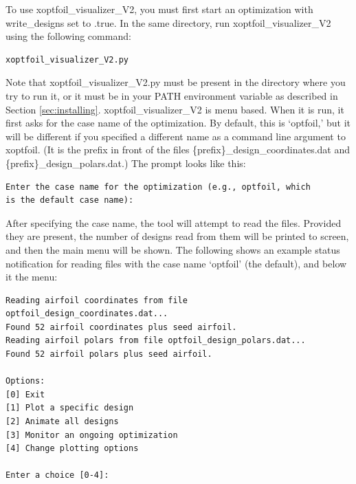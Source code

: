 \documentclass[11pt]{article}
\begin{document}
To use xoptfoil\_visualizer\_V2, you must first start an optimization with write\_designs set
to .true. In the same directory, run xoptfoil\_visualizer\_V2 using the following command:

\begin{verbatim}
xoptfoil_visualizer_V2.py
\end{verbatim}

Note that xoptfoil\_visualizer\_V2.py must be present in the directory where you try to run it,
or it must be in your PATH environment variable as described in Section
\ref{sec:installing}. xoptfoil\_visualizer\_V2 is menu based.  When it is run, 
it first asks for the case name of the optimization.  By default, this is `optfoil,' but
it will be different if you specified a different name as a command line argument to
xoptfoil. (It is the prefix in front of the files 
\{prefix\}\_design\_coordinates.dat and
\{prefix\}\_design\_polars.dat.)  The prompt looks like this:

\begin{verbatim}
Enter the case name for the optimization (e.g., optfoil, which 
is the default case name): 
\end{verbatim}

After specifying the case name, the tool will attempt to read the files.  Provided they
are present, the number of designs read from them will be printed to screen, and then the
main menu will be shown.  The following shows an example status notification for reading
files with the case name `optfoil' (the default), and below it the menu:

\begin{verbatim}
Reading airfoil coordinates from file optfoil_design_coordinates.dat...
Found 52 airfoil coordinates plus seed airfoil.
Reading airfoil polars from file optfoil_design_polars.dat...
Found 52 airfoil polars plus seed airfoil.

Options:
[0] Exit
[1] Plot a specific design
[2] Animate all designs 
[3] Monitor an ongoing optimization
[4] Change plotting options

Enter a choice [0-4]: 
\end{verbatim}
\end{document}
